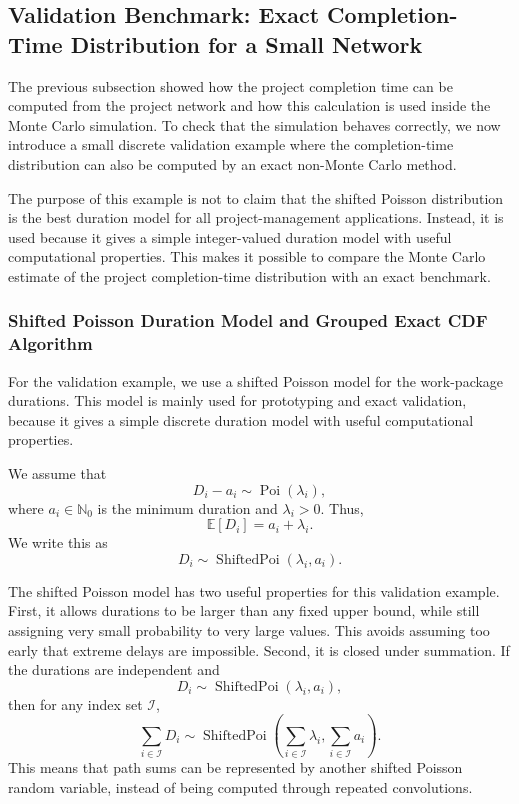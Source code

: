 \documentclass[11pt,a4paper]{article}
\providecommand{\E}{\mathbb{E}}
\newcommand{\E}{\mathbb{E}}
\newcommand{\1}{\mathbf{1}}
\theoremstyle{definition}
\theoremstyle{plain}
\theoremstyle{remark}
\numberwithin{equation}{section}
\begin{document}
\subsection{Validation Benchmark: Exact Completion-Time Distribution for a Small Network}

The previous subsection showed how the project completion time can be computed from the project network and how this calculation is used inside the Monte Carlo simulation. To check that the simulation behaves correctly, we now introduce a small discrete validation example where the completion-time distribution can also be computed by an exact non-Monte Carlo method.

The purpose of this example is not to claim that the shifted Poisson distribution is the best duration model for all project-management applications. Instead, it is used because it gives a simple integer-valued duration model with useful computational properties. This makes it possible to compare the Monte Carlo estimate of the project completion-time distribution with an exact benchmark.

\subsubsection{Shifted Poisson Duration Model and Grouped Exact CDF Algorithm}

For the validation example, we use a shifted Poisson model for the work-package durations. This model is mainly used for prototyping and exact validation, because it gives a simple discrete duration model with useful computational properties.

We assume that
\[
D_i-a_i \sim \operatorname{Poi}(\lambda_i),
\]
where $a_i\in\mathbb{N}_0$ is the minimum duration and $\lambda_i>0$. Thus,
\[
\E[D_i]=a_i+\lambda_i.
\]
We write this as
\[
D_i\sim \operatorname{ShiftedPoi}(\lambda_i,a_i).
\]

The shifted Poisson model has two useful properties for this validation example. First, it allows durations to be larger than any fixed upper bound, while still assigning very small probability to very large values. This avoids assuming too early that extreme delays are impossible. Second, it is closed under summation. If the durations are independent and
\[
D_i\sim \operatorname{ShiftedPoi}(\lambda_i,a_i),
\]
then for any index set $\mathcal{I}$,
\[
\sum_{i\in\mathcal{I}}D_i
\sim
\operatorname{ShiftedPoi}
\left(
\sum_{i\in\mathcal{I}}\lambda_i,
\sum_{i\in\mathcal{I}}a_i
\right).
\]
This means that path sums can be represented by another shifted Poisson random variable, instead of being computed through repeated convolutions.
\end{document}
